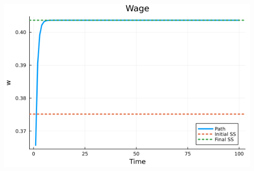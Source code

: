 \documentclass[12pt]{article}
\begin{document}
\begin{center}
    \includegraphics*[scale = 0.5]{fig5.png}
\end{center}
\end{document}
